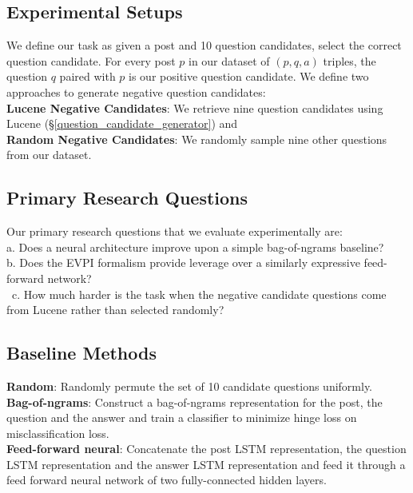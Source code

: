 \documentclass[11pt,a4paper]{article}
\begin{document}
\subsection{Experimental Setups}\label{task_setup}
We define our task as given a post and 10 question candidates, select the correct question candidate. For every post $p$ in our dataset of $(p, q, a)$ triples, the question $q$ paired with $p$ is our positive question candidate. We define two approaches to generate negative question candidates: \\
\textbf{Lucene Negative Candidates}: We retrieve nine question candidates using Lucene (\S\ref{question_candidate_generator}) and \\
\textbf{Random Negative Candidates}: We randomly sample nine other questions from our dataset.

\subsection{Primary Research Questions}\label{experiments_results}
Our primary research questions that we evaluate experimentally are:\\
a. Does a neural architecture improve upon a simple bag-of-ngrams baseline?\\
b. Does the EVPI formalism provide leverage over a similarly expressive feed-forward network?\\\
c. How much harder is the task when the negative candidate questions come from Lucene rather than selected randomly?

\subsection{Baseline Methods}\label{baselines}

\textbf{Random}: Randomly permute the set of 10 candidate questions uniformly.\\
\textbf{Bag-of-ngrams}: Construct a bag-of-ngrams representation for the post, the question and the answer and train a classifier to minimize hinge loss on misclassification loss. \\
\textbf{Feed-forward neural}: Concatenate the post LSTM representation, the question LSTM representation and the answer LSTM representation and feed it through a feed forward neural network of two fully-connected hidden layers.
\end{document}
